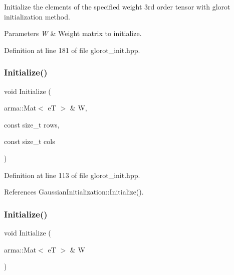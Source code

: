 Initialize the elements of the specified weight 3rd order tensor with glorot initialization method. 


\begin{DoxyParams}{Parameters}
{\em W} & Weight matrix to initialize. \\
\hline
\end{DoxyParams}


Definition at line 181 of file glorot\+\_\+init.\+hpp.

\mbox{\label{classmlpack_1_1ann_1_1GlorotInitializationType_a8a614fcc8aeff6f47c9f608762411e2a}} 
\subsubsection{Initialize()\hspace{0.1cm}{\footnotesize\ttfamily [5/8]}}
{\footnotesize\ttfamily void Initialize (\begin{DoxyParamCaption}\item[{arma\+::\+Mat$<$ eT $>$ \&}]{W,  }\item[{const size\+\_\+t}]{rows,  }\item[{const size\+\_\+t}]{cols }\end{DoxyParamCaption})\hspace{0.3cm}{\ttfamily [inline]}}



Definition at line 113 of file glorot\+\_\+init.\+hpp.



References Gaussian\+Initialization\+::\+Initialize().

\mbox{\label{classmlpack_1_1ann_1_1GlorotInitializationType_a24da1718009511401802942918bd3261}} 
\subsubsection{Initialize()\hspace{0.1cm}{\footnotesize\ttfamily [6/8]}}
{\footnotesize\ttfamily void Initialize (\begin{DoxyParamCaption}\item[{arma\+::\+Mat$<$ eT $>$ \&}]{W }\end{DoxyParamCaption})\hspace{0.3cm}{\ttfamily [inline]}}



